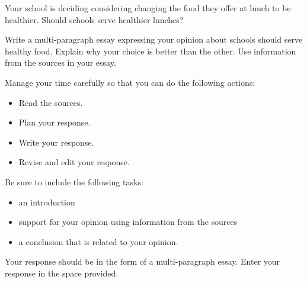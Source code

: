 \documentclass[12pt]{article}
\begin{document}
\vspace{1em}
\begin{tcolorbox}[colframe=black!60, colback=white, 
coltitle=black, colbacktitle=black!15, fonttitle=\bfseries\Large, 
title=Example Test Prompt, halign title=center, left=10pt, right=10pt, top=10pt, bottom=15pt]
Your school is deciding considering changing the food they offer at lunch to be healthier. Should schools serve healthier lunches?

Write a multi-paragraph essay expressing your opinion about schools should serve healthy food. Explain why your choice is better than the other. Use information from the sources in your essay.

Manage your time carefully so that you can do the following actions:
\begin{itemize}
    \item Read the sources.
    \item Plan your response.
    \item Write your response.
    \item Revise and edit your response.
\end{itemize}
Be sure to include the following tasks:
\begin{itemize}
    \item an introduction
    \item support for your opinion using information from the sources
    \item a conclusion that is related to your opinion.
\end{itemize}
Your response should be in the form of a multi-paragraph essay. Enter your response in the space provided.
\end{tcolorbox}

\vspace{1em}
\end{document}
